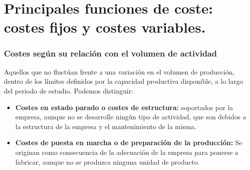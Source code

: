 \documentclass[12pt]{report} %
\begin{document}
\hypertarget{principales-funciones-de-coste-costes-fijos-y-costes-variables.}{%
\section{Principales funciones de coste: costes fijos y costes
variables.}\label{principales-funciones-de-coste-costes-fijos-y-costes-variables.}}

\hypertarget{costes-seguxfan-su-relaciuxf3n-con-el-volumen-de-actividad}{%
\subsubsection{Costes según su relación con el volumen de
actividad}\label{costes-seguxfan-su-relaciuxf3n-con-el-volumen-de-actividad}}

\begin{definicion}
Aquellos que no fluctúan frente a una variación en el volumen de producción, dentro de los límites definidos por la capacidad productiva disponible, a lo largo del periodo de estudio. Podemos distinguir:
\begin{itemize}
\item \textbf{Costes en estado parado o costes de estructura:} soportados por la empresa, aunque no se desarrolle ningún tipo de actividad, que son debidos a la estructura de la empresa y el mantenimiento de la misma.
\item \textbf{Costes de puesta en marcha o de preparación de la producción:} Se originan como consecuencia de la adecuación de la empresa para ponerse a fabricar, aunque no se produzca ninguna unidad de producto. 
\end{itemize} 
\end{definicion}
\end{document}

